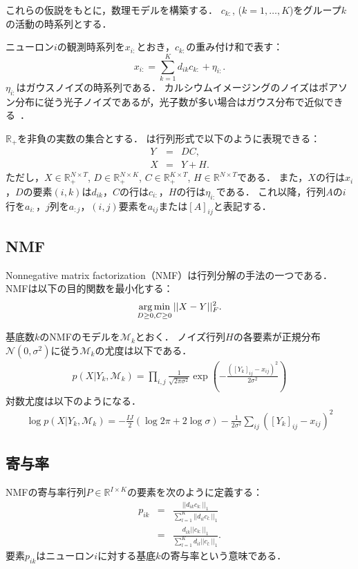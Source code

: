 これらの仮説をもとに，数理モデルを構築する．
$c_{k:}$, ($k=1,\dots,K$)をグループ$k$の活動の時系列とする．

ニューロン$i$の観測時系列を$x_{i:}$とおき，$c_{k:}$の重み付け和で表す：
\begin{equation}
	x_{i:} = \sum_{k=1}^K d_{ik} c_{k:} + \eta_{i:}.
  \label{eq:x}
\end{equation}
$\eta_{i:}$はガウスノイズの時系列である．
カルシウムイメージングのノイズはポアソン分布に従う光子ノイズであるが，光子数が多い場合はガウス分布で近似できる~\cite{Sjulson2007}．

$\mathbb{R}_+$を非負の実数の集合とする．
は行列形式で以下のように表現できる：
\begin{eqnarray}
  Y &=& DC, \\
  X &=& Y + H.
  \label{model_matrix}
\end{eqnarray}
ただし，$X \in \mathbb{R}_+^{N \times T}$, $D \in \mathbb{R}_+^{N \times K}$, $C \in \mathbb{R}_+^{K \times T}$, $H \in \mathbb{R}^{N \times T}$である．
また，$X$の行は$x_i$，$D$の要素$(i,k)$は$d_{ik}$，$C$の行は$c_{i:}$，$H$の行は$\eta_{i:}$である．
これ以降，行列$A$の$i$行を$a_{i:}$，$j$列を$a_{:j}$，$(i,j)$要素を$a_{ij}$または$[A]_{ij}$と表記する．

\subsection{NMF}
Nonnegative matrix factorization（NMF）\cite{Lee1999}は行列分解の手法の一つである．
NMFは以下の目的関数を最小化する：
\begin{equation}
	\operatorname*{arg\,min}_{D \geq 0, C \geq 0} ||X - Y||_F^2.
  \label{eq:NMF}
\end{equation}

基底数$k$のNMFのモデルを$\mathcal{M}_k$とおく．
ノイズ行列$H$の各要素が正規分布$\mathcal{N} (0, \sigma^2)$に従う$\mathcal{M}_k$の尤度は以下である．
\begin{eqnarray}
	p(X | Y_k, \mathcal{M}_k) = \prod_{i,j} \frac{1}{\sqrt{2 \pi \sigma^2}} \exp(-\frac{([Y_k]_{ij} - x_{ij})^2}{2 \sigma^2})
\end{eqnarray}
対数尤度は以下のようになる．
\begin{eqnarray}
	\log p(X | Y_k, \mathcal{M}_k) = - \frac{IJ}{2} (\log 2\pi + 2 \log \sigma) - \frac{1}{2 \sigma^2} \sum_{ij}([Y_k]_{ij} - x_{ij})^2
\end{eqnarray}

\subsection{寄与率}
NMFの寄与率行列$P \in \mathbb{R}^{I \times K}$の要素を次のように定義する：
\begin{eqnarray}
	p_{ik} &=& \frac{||d_{ik} c_{k:}||_1}{\sum_{l=1}^K || d_{il} c_{l:} ||_1} \\
	&=& \frac{d_{ik} || c_{k:} ||_1}{ \sum_{l=1}^K d_{il} || c_{l:} ||_1 }.
\end{eqnarray}
要素$p_{ik}$はニューロン$i$に対する基底$k$の寄与率という意味である．

